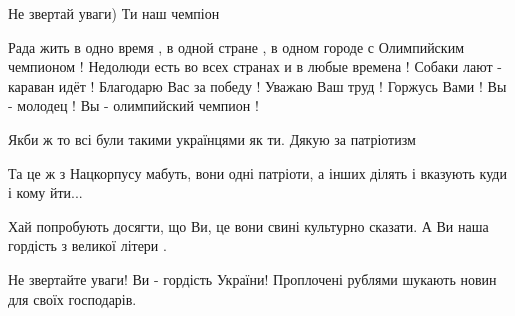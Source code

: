 \begin{itemize}
 
Не звертай уваги) Ти наш чемпіон 🥇

 

Рада жить в одно время , в одной стране , в одном городе с Олимпийским
чемпионом ! Недолюди есть во всех странах и в любые времена ! Собаки лают -
караван идёт ! Благодарю Вас за победу ! Уважаю Ваш труд ! Горжусь Вами ! Вы -
молодец ! Вы - олимпийский чемпион !


 
Якби ж то всі були такими українцями як ти. Дякую за патріотизм

 
Та це ж з Нацкорпусу мабуть, вони одні патріоти, а інших ділять і вказують куди і кому йти...

 
Хай попробують досягти, що Ви, це вони свині культурно сказати. А Ви наша гордість з великої літери .

 
Не звертайте уваги! Ви - гордість України! Проплочені рублями шукають новин для своїх господарів.


\end{itemize}
